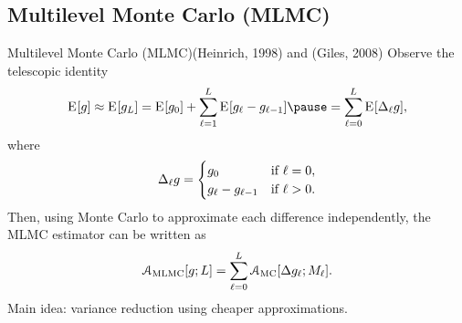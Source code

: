 \subsection{Multilevel Monte Carlo (MLMC)}
\begin{frame}{Multilevel Monte Carlo (MLMC){\quad \tiny (Heinrich, 1998) and (Giles, 2008)}}
  Observe the telescopic identity
  \[
    \E{\func} \approx \E{\func_{L}} = \E{\func_{0}} +
    \sum_{{\ell}=1}^{L} \E{\func_{\ell} -
      \func_{{\ell - 1}}} \pause
= \sum_{{\ell}=0}^{{L}} \E{ \Delta_\ell \func}, \]
where
  \begin{align*}
    \Delta_\ell g = \begin{cases}
      g_{0} & \text{if } \ell=0, \\
      g_{{\ell}} -   g_{{\ell-1}} & \text{if } \ell> 0.
      \end{cases}
    \end{align*}
    \pause Then, using Monte Carlo to approximate each difference independently, the
    MLMC estimator can be written as
    \begin{align*}
      \estmlmc{\func ; L} = \sum_{{\ell}=0}^{{L}} \estmc{\Delta
      \func_\ell ; M_\ell}.
    \end{align*}
    Main idea: variance reduction using cheaper approximations.
\end{frame}



